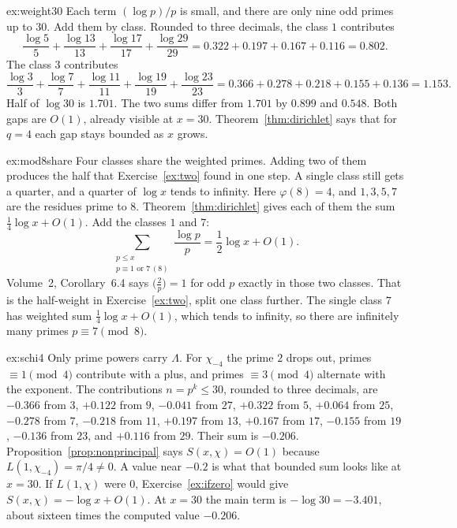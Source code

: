 \begin{solution}{ex:weight30}
\idea Each term $(\log p)/p$ is small, and there are only nine odd primes up to $30$. Add them by class.
\writeup Rounded to three decimals, the class $1$ contributes
\[
\frac{\log5}5+\frac{\log13}{13}+\frac{\log17}{17}+\frac{\log29}{29}=0.322+0.197+0.167+0.116=0.802.
\]
The class $3$ contributes
\[
\frac{\log3}3+\frac{\log7}7+\frac{\log11}{11}+\frac{\log19}{19}+\frac{\log23}{23}=0.366+0.278+0.218+0.155+0.136=1.153.
\]
Half of $\log 30$ is $1.701$. The two sums differ from $1.701$ by $0.899$ and $0.548$. Both gaps are $O(1)$, already visible at $x=30$. Theorem~\ref{thm:dirichlet} says that for $q=4$ each gap stays bounded as $x$ grows.
\end{solution}

\begin{solution}{ex:mod8share}
\idea Four classes share the weighted primes. Adding two of them produces the half that Exercise~\ref{ex:two} found in one step. A single class still gets a quarter, and a quarter of $\log x$ tends to infinity.
\writeup Here $\varphi(8)=4$, and $1,3,5,7$ are the residues prime to $8$. Theorem~\ref{thm:dirichlet} gives each of them the sum $\frac14\log x+O(1)$. Add the classes $1$ and $7$:
\[
\sum_{\substack{p\le x\\p\equiv1\text{ or }7\,(8)}}\frac{\log p}p=\frac12\log x+O(1).
\]
Volume~2, Corollary~6.4 says $\bigl(\frac2p\bigr)=1$ for odd $p$ exactly in those two classes. That is the half-weight in Exercise~\ref{ex:two}, split one class further. The single class $7$ has weighted sum $\frac14\log x+O(1)$, which tends to infinity, so there are infinitely many primes $p\equiv7\pmod8$.
\end{solution}

\begin{solution}{ex:schi4}
\idea Only prime powers carry $\Lambda$. For $\chi_{-4}$ the prime $2$ drops out, primes $\equiv1\pmod4$ contribute with a plus, and primes $\equiv3\pmod4$ alternate with the exponent.
\writeup The contributions $n=p^k\le30$, rounded to three decimals, are $-0.366$ from $3$, $+0.122$ from $9$, $-0.041$ from $27$, $+0.322$ from $5$, $+0.064$ from $25$, $-0.278$ from $7$, $-0.218$ from $11$, $+0.197$ from $13$, $+0.167$ from $17$, $-0.155$ from $19$, $-0.136$ from $23$, and $+0.116$ from $29$. Their sum is $-0.206$. Proposition~\ref{prop:nonprincipal} says $S(x,\chi)=O(1)$ because $L(1,\chi_{-4})=\pi/4\ne0$. A value near $-0.2$ is what that bounded sum looks like at $x=30$. If $L(1,\chi)$ were $0$, Exercise~\ref{ex:ifzero} would give $S(x,\chi)=-\log x+O(1)$. At $x=30$ the main term is $-\log 30=-3.401$, about sixteen times the computed value $-0.206$.
\end{solution}

